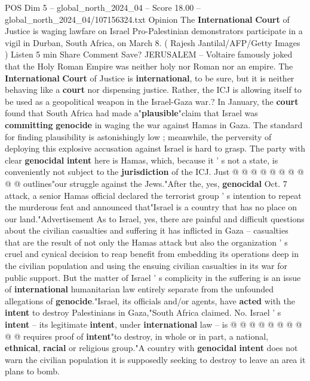 \begin{textsample}{POS Dim 5 – global\_north\_2024\_04 – Score 18.00 – global\_north\_2024\_04/107156324.txt}  \label{ex:f5_pos_281}
Opinion The \textbf{International} \textbf{Court} of Justice is waging lawfare on Israel Pro-Palestinian demonstrators participate in a vigil in Durban, South Africa, on March 8. ( Rajesh Jantilal/AFP/Getty Images ) Listen 5 min Share Comment Save?
JERUSALEM -- Voltaire famously joked that the Holy Roman Empire was neither holy nor Roman nor an empire.
The \textbf{International} \textbf{Court} of Justice is \textbf{international}, to be sure, but it is neither behaving like a \textbf{court} nor dispensing justice.
Rather, the ICJ is allowing itself to be used as a geopolitical weapon in the Israel-Gaza war.?
In January, the \textbf{court} found that South Africa had made a"\textbf{plausible}"claim that Israel was \textbf{committing} \textbf{genocide} in waging the war against Hamas in Gaza.
The standard for finding plausibility is astonishingly low ; meanwhile, the perversity of deploying this explosive accusation against Israel is hard to grasp.
The party with clear \textbf{genocidal} \textbf{intent} here is Hamas, which, because it ' s not a state, is conveniently not subject to the \textbf{jurisdiction} of the ICJ.
Just @ @ @ @ @ @ @ @ @ @ outlines"our struggle against the Jews."After the, yes, \textbf{genocidal} Oct. 7 attack, a senior Hamas official declared the terrorist group ' s intention to repeat the murderous feat and announced that"Israel is a country that has no place on our land."Advertisement As to Israel, yes, there are painful and difficult questions about the civilian casualties and suffering it has inflicted in Gaza -- casualties that are the result of not only the Hamas attack but also the organization ' s cruel and cynical decision to reap benefit from embedding its operations deep in the civilian population and using the ensuing civilian casualties in its war for public support.
But the matter of Israel ' s complicity in the suffering is an issue of \textbf{international} humanitarian law entirely separate from the unfounded allegations of \textbf{genocide}."Israel, its officials and/or agents, have \textbf{acted} with the \textbf{intent} to destroy Palestinians in Gaza,"South Africa claimed.
No.
Israel ' s \textbf{intent} -- its legitimate \textbf{intent}, under \textbf{international} law -- is @ @ @ @ @ @ @ @ @ @ requires proof of \textbf{intent}"to destroy, in whole or in part, a national, \textbf{ethnical}, \textbf{racial} or religious group."A country with \textbf{genocidal} \textbf{intent} does not warn the civilian population it is supposedly seeking to destroy to leave an area it plans to bomb.

\end{textsample}
